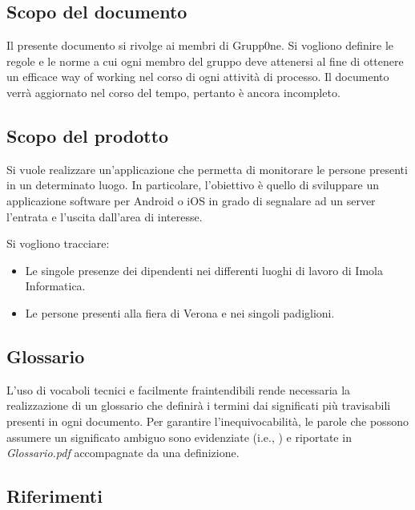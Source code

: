 \documentclass[../norme-di-progetto.tex]{subfiles}
\begin{document}
\subsection{Scopo del documento}%
\label{sub:scopo del documento}

Il presente documento si rivolge ai membri di Grupp0ne.
Si vogliono definire le regole e le norme a cui ogni membro del gruppo deve attenersi al fine di ottenere un efficace way of working nel corso di ogni attività di processo.
Il documento verrà aggiornato nel corso del tempo, pertanto è ancora incompleto.

\subsection{Scopo del prodotto}%
\label{sub:scopo del prodotto}

Si vuole realizzare un'applicazione che permetta di monitorare le persone presenti in un determinato luogo.
In particolare, l'obiettivo è quello di sviluppare un applicazione software per Android o iOS in grado di segnalare ad un server l'entrata e l'uscita dall'area di interesse.

Si vogliono tracciare:

\begin{itemize}
  \item Le singole presenze dei dipendenti nei differenti luoghi di lavoro di Imola Informatica.
  \item Le persone presenti alla fiera di Verona e nei singoli padiglioni.
\end{itemize}

\subsection{Glossario}%
\label{sub:glossario}

L'uso di vocaboli tecnici e facilmente fraintendibili rende necessaria la realizzazione di un glossario che definirà i termini dai significati più travisabili presenti in ogni documento.
Per garantire l'inequivocabilità, le parole che possono assumere un significato ambiguo sono evidenziate (i.e., ) e riportate in \textit{Glossario.pdf} accompagnate da una definizione.

\subsection{Riferimenti}%
\label{sub:riferimenti}
\end{document}

